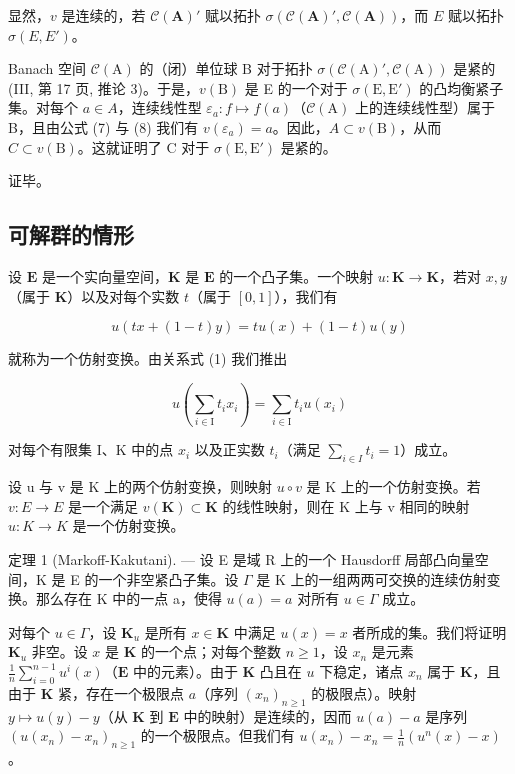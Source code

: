 显然，\(v\) 是连续的，若 \(\mathcal{C}(\mathbf{A})'\) 赋以拓扑 \(\sigma(\mathcal{C}(\mathbf{A})', \mathcal{C}(\mathbf{A}))\)，而 \(E\) 赋以拓扑 \(\sigma(E, E')\)。

Banach 空间 \(\mathcal{C}(\mathrm{A})\) 的（闭）单位球 B 对于拓扑 \(\sigma(\mathcal{C}(\mathrm{A})', \mathcal{C}(\mathrm{A}))\) 是紧的 (III, 第 17 页, 推论 3)。于是，\(v(\mathrm{B})\) 是 E 的一个对于 \(\sigma(\mathrm{E}, \mathrm{E}')\) 的凸均衡紧子集。对每个 \(a \in A\)，连续线性型 \(\varepsilon_a : f \mapsto f(a)\)（\(\mathcal{C}(\mathrm{A})\) 上的连续线性型）属于 B，且由公式 (7) 与 (8) 我们有 \(v(\varepsilon_a) = a\)。因此，\(A \subset v(\mathrm{B})\)，从而 \(C \subset v(\mathrm{B})\)。这就证明了 C 对于 \(\sigma(\mathrm{E}, \mathrm{E}')\) 是紧的。

证毕。


\subsection{可解群的情形}

设 \(\mathbf{E}\) 是一个实向量空间，\(\mathbf{K}\) 是 \(\mathbf{E}\) 的一个凸子集。一个映射 \(u: \mathbf{K} \to \mathbf{K}\)，若对 \(x, y\)（属于 \(\mathbf{K}\)）以及对每个实数 \(t\)（属于 \([0, 1]\)），我们有

\[
u (t x + (1 - t) y) = t u (x) + (1 - t) u (y)\tag{1}
\]

就称为一个仿射变换。由关系式 (1) 我们推出

\[
u \left(\sum_ {i \in \mathrm{I}} t _ {i} x _ {i}\right) = \sum_ {i \in \mathrm{I}} t _ {i} u \left(x _ {i}\right)\tag{2}
\]

对每个有限集 I、K 中的点 \(x_{i}\) 以及正实数 \(t_i\)（满足 \(\sum_{i\in I}t_i = 1\)）成立。

设 u 与 v 是 K 上的两个仿射变换，则映射 \(u \circ v\) 是 K 上的一个仿射变换。若 \(v: E \to E\) 是一个满足 \(v(\mathbf{K}) \subset \mathbf{K}\) 的线性映射，则在 K 上与 v 相同的映射 \(u: K \to K\) 是一个仿射变换。

定理 1 (Markoff-Kakutani). --- 设 E 是域 R 上的一个 Hausdorff 局部凸向量空间，K 是 E 的一个非空紧凸子集。设 \(\Gamma\) 是 K 上的一组两两可交换的连续仿射变换。那么存在 K 中的一点 a，使得 \(u(a) = a\) 对所有 \(u \in \Gamma\) 成立。

对每个 \(u \in \Gamma\)，设 \(\mathbf{K}_u\) 是所有 \(x \in \mathbf{K}\) 中满足 \(u(x) = x\) 者所成的集。我们将证明 \(\mathbf{K}_u\) 非空。设 \(x\) 是 \(\mathbf{K}\) 的一个点；对每个整数 \(n \geqslant 1\)，设 \(x_n\) 是元素 \(\frac{1}{n} \sum_{i=0}^{n-1} u^i(x)\)（\(\mathbf{E}\) 中的元素）。由于 \(\mathbf{K}\) 凸且在 \(u\) 下稳定，诸点 \(x_n\) 属于 \(\mathbf{K}\)，且由于 \(\mathbf{K}\) 紧，存在一个极限点 \(a\)（序列 \((x_n)_{n \geqslant 1}\) 的极限点）。映射 \(y \mapsto u(y) - y\)（从 \(\mathbf{K}\) 到 \(\mathbf{E}\) 中的映射）是连续的，因而 \(u(a) - a\) 是序列 \((u(x_n) - x_n)_{n \geqslant 1}\) 的一个极限点。但我们有 \(u(x_n) - x_n = \frac{1}{n} (u^n(x) - x)\)。

